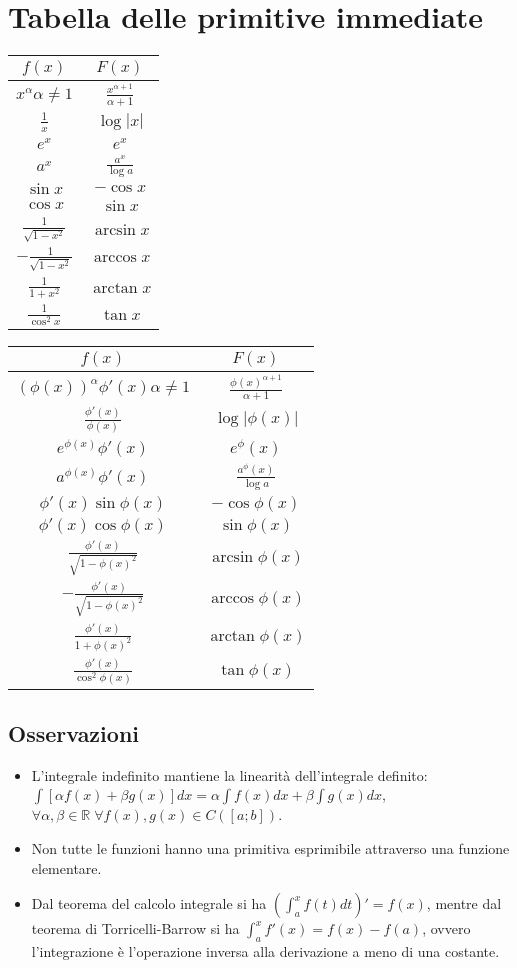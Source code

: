 \section{Tabella delle primitive immediate}
\begin{center}
\begin{tabular}{c|c}
$f(x)$ & $F(x)$\\
\hline
$x^\alpha$\tiny{$\alpha\neq 1$} & $\frac{x^{\alpha+1}}{\alpha+1}$ \\ 
$\frac{1}{x}$ & $\log |x|$\\
$e^x$ & $e^x$\\
$a^x$ & $\frac{a^x}{\log a}$\\
$\sin x$ & $-\cos x$\\
$\cos x$ & $\sin x$\\
$\frac{1}{\sqrt{1-x^2}}$ & $\arcsin x$\\
$-\frac{1}{\sqrt{1-x^2}}$ & $\arccos x$\\
$\frac{1}{1+x^2}$ & $\arctan x$\\
$\frac{1}{\cos^2 x} $ & $\tan x$\\
\end{tabular}
\begin{tabular}{c|c}
$f(x)$ & $F(x)$\\
\hline
$(\phi(x))^\alpha\phi'(x)$\tiny{$\alpha\neq 1$} & $\frac{\phi(x)^{\alpha+1}}{\alpha+1}$ \\ 
$\frac{\phi'(x)}{\phi(x)}$ & $\log |\phi(x)|$\\
$e^{\phi(x)}\phi'(x)$ & $e^\phi(x)$\\
$a^{\phi(x)}\phi'(x)$ & $\frac{a^\phi(x)}{\log a}$\\
$\phi'(x)\sin \phi(x)$ & $-\cos \phi(x)$\\
$\phi'(x)\cos \phi(x)$ & $\sin \phi(x)$\\
$\frac{\phi'(x)}{\sqrt{1-\phi(x)^2}}$ & $\arcsin \phi(x)$\\
$-\frac{\phi'(x)}{\sqrt{1-\phi(x)^2}}$ & $\arccos \phi(x)$\\
$\frac{\phi'(x)}{1+\phi(x)^2}$ & $\arctan \phi(x)$\\
$\frac{\phi'(x)}{\cos^2 \phi(x)} $ & $\tan \phi(x)$\\
\end{tabular}
\end{center}
\subsection{Osservazioni}
\begin{itemize}
\item L'integrale indefinito mantiene la linearit\`a dell'integrale definito: $\int [\alpha f(x)+\beta g(x)]dx=\alpha\int f(x)dx+\beta\int g(x)dx$, $\forall \alpha, \beta\in
\mathbb{R}\;\forall f(x),g(x)\in C([a;b])$.
\item Non tutte le funzioni hanno una primitiva esprimibile attraverso una funzione elementare.
\item Dal teorema del calcolo integrale si ha $(\int_a^x f(t)dt)'=f(x)$, mentre dal teorema di Torricelli-Barrow si ha $\int_a^x f'(x)=f(x)-f(a)$, ovvero l'integrazione \`e 
l'operazione inversa alla derivazione a meno di una costante.
\end{itemize}
